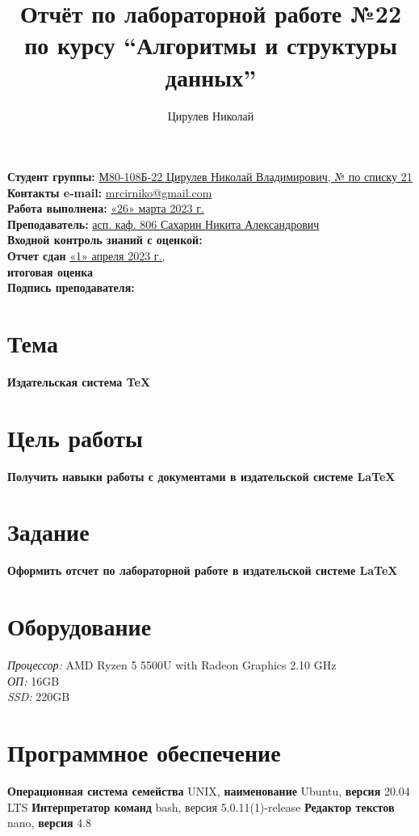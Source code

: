 \documentclass[12pt, letterpaper]{article}
\title{Отчёт по лабораторной работе №22 по курсу “Алгоритмы и структуры данных”}
\author{Цирулев Николай}
\begin{document}
\maketitle
\begin{description}
\textbf{Студент группы:} \underline{М80-108Б-22 Цирулев Николай Владимирович, № по списку 21}\\
\textbf{Контакты e-mail:} \underline{mrcirniko@gmail.com}\\
\textbf{Работа выполнена:} \underline{«26» марта 2023 г.}\\
\textbf{Преподаватель:} \underline{асп. каф. 806 Сахарин Никита Александрович}\\
\textbf{Входной контроль знаний с оценкой:}\\
\textbf{Отчет сдан} \underline{«1» апреля 2023 г.,}\\ \textbf{итоговая оценка}\\
\textbf{Подпись преподавателя:} \underline{\hspace{3cm}}\\
\end{description}
\section{Тема}
\textbf{Издательская система \TeX}
\section{Цель работы}
\textbf{Получить навыки работы с документами в издательской системе \LaTeX}
\section{Задание}
\textbf{Оформить отсчет по лабораторной работе в издательской системе \LaTeX}
\section{Оборудование}
\textit {Процессор:} AMD Ryzen 5 5500U with Radeon Graphics 2.10 GHz\\
\textit{ОП:} 16GB\\
\textit {SSD:} 220GB
\section{Программное обеспечение}
\textbf{Операционная система семейства} UNIX, \textbf{наименование} Ubuntu, \textbf{версия} 20.04 LTS \textbf{Интерпретатор команд} bash, версия 5.0.11(1)-release \textbf{Редактор текстов} nano, \textbf{версия} 4.8
\end{document}
